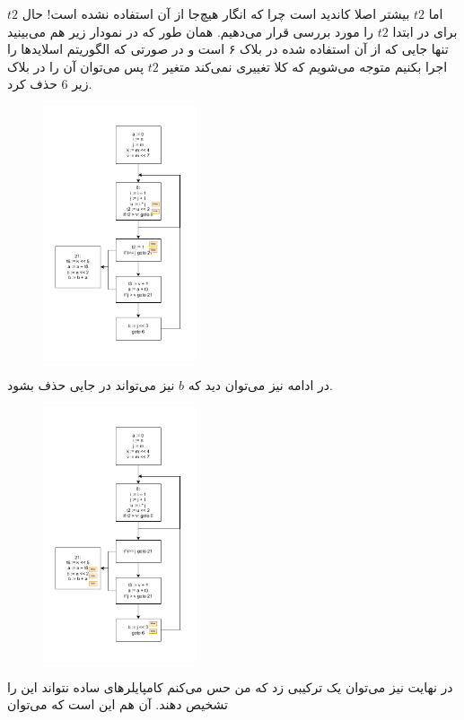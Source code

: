 \documentclass[]{article}
\begin{document}
$t2$
اما
$t2$
بیشتر اصلا کاندید
است چرا که انگار هیچ‌جا از آن استفاده نشده است! حال برای
در ابتدا
$t2$
را مورد بررسی قرار می‌دهیم. همان طور که در نمودار زیر هم می‌بینید تنها جایی که از آن استفاده شده
در بلاک ۶ است و در صورتی که الگوریتم اسلاید‌ها را اجرا بکنیم متوجه می‌شویم که کلا تغییری نمی‌کند متغیر
$t2$
پس می‌توان آن را در بلاک زیر 6 حذف کرد.
\begin{figure}[H]
    \centering
    \includegraphics[width=0.4\textwidth]{figure/Q5-05-t2-deadcode.pdf}
\end{figure}
در ادامه نیز می‌توان دید که
$b$
نیز می‌تواند در جایی حذف بشود.
\begin{figure}[H]
    \centering
    \includegraphics[width=0.4\textwidth]{figure/Q5-06-b-deadcode.pdf}
\end{figure}
در نهایت نیز می‌توان یک
ترکیبی زد که من حس می‌کنم کامپایلر‌های ساده نتواند این را تشخیص دهند. آن هم این است که می‌توان
\end{document}
